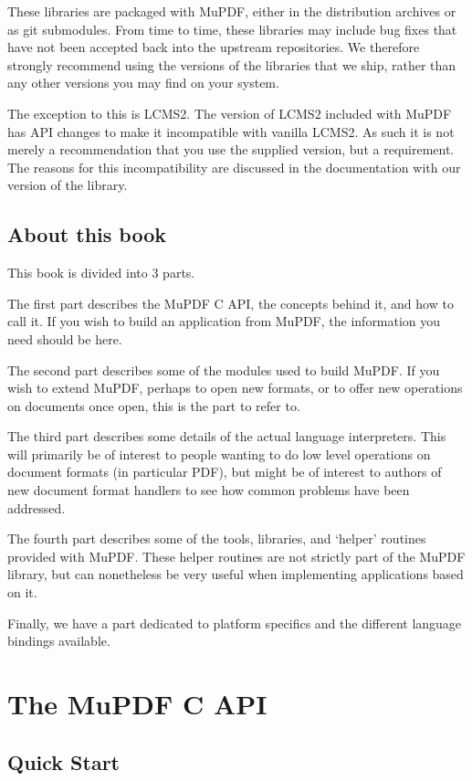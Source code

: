 \documentclass[oneside]{book}
\begin{document}
These libraries are packaged with MuPDF, either in the distribution archives or as git submodules. From time to time, these libraries may include bug fixes that have not been accepted back into the upstream repositories. We therefore strongly recommend using the versions of the libraries that we ship, rather than any other versions you may find on your system.

The exception to this is LCMS2. The version of LCMS2 included with MuPDF has API changes to make it incompatible with vanilla LCMS2. As such it is not merely a recommendation that you use the supplied version, but a requirement. The reasons for this incompatibility are discussed in the documentation with our version of the library.

\chapter{About this book}

This book is divided into 3 parts.

The first part describes the MuPDF C API, the concepts behind it, and how to call it. If you wish to build an application from MuPDF, the information you need should be here.

The second part describes some of the modules used to build MuPDF. If you wish to extend MuPDF, perhaps to open new formats, or to offer new operations on documents once open, this is the part to refer to.

The third part describes some details of the actual language interpreters. This will primarily be of interest to people wanting to do low level operations on document formats (in particular PDF), but might be of interest to authors of new document format handlers to see how common problems have been addressed.

The fourth part describes some of the tools, libraries, and `helper' routines provided with MuPDF. These helper routines are not strictly part of the MuPDF library, but can nonetheless be very useful when implementing applications based on it.

Finally, we have a part dedicated to platform specifics and the different language bindings available.

\part{The MuPDF C API}

\chapter{Quick Start}
\end{document}
